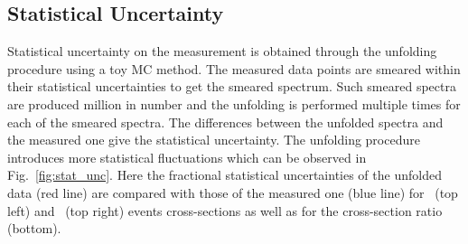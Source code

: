 \subsection{Statistical Uncertainty}
\label{sec:unfolding_stat}
Statistical uncertainty on the measurement is obtained through the unfolding procedure using a toy MC method. The measured data points are smeared within their statistical uncertainties to get the smeared spectrum. Such smeared spectra are produced million in number and the unfolding is performed multiple times for each of the smeared spectra. The differences between the unfolded spectra and the measured one give the statistical uncertainty. The unfolding procedure introduces more statistical fluctuations which can be observed in Fig.~\ref{fig:stat_unc}. Here the fractional statistical uncertainties of the unfolded data (red line) are compared with those of the measured one (blue line) for \njt~(top left) and \njth~(top right) events cross-sections as well as for the cross-section ratio \ratio (bottom). 

